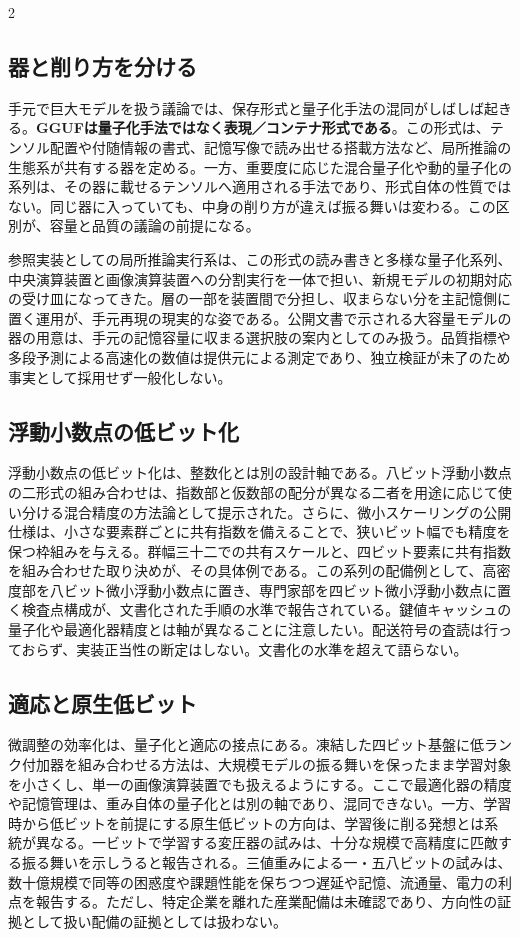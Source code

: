 \documentclass[lualatex,a4paper,10pt]{jlreq}
\begin{document}
\begin{multicols}{2}
\subsection{器と削り方を分ける}
手元で巨大モデルを扱う議論では、保存形式と量子化手法の混同がしばしば起きる。\textbf{GGUFは量子化手法ではなく表現／コンテナ形式である}\autocite{gguf}。この形式は、テンソル配置や付随情報の書式、記憶写像で読み出せる搭載方法など、局所推論の生態系が共有する器を定める。一方、重要度に応じた混合量子化や動的量子化の系列は、その器に載せるテンソルへ適用される手法であり、形式自体の性質ではない。同じ器に入っていても、中身の削り方が違えば振る舞いは変わる。この区別が、容量と品質の議論の前提になる。

参照実装としての局所推論実行系は、この形式の読み書きと多様な量子化系列、中央演算装置と画像演算装置への分割実行を一体で担い、新規モデルの初期対応の受け皿になってきた\autocite{llamacpp}。層の一部を装置間で分担し、収まらない分を主記憶側に置く運用が、手元再現の現実的な姿である。公開文書で示される大容量モデルの器の用意は、手元の記憶容量に収まる選択肢の案内としてのみ扱う\autocite{unslothglm}。品質指標や多段予測による高速化の数値は提供元による測定であり、独立検証が未了のため事実として採用せず一般化しない。

\subsection{浮動小数点の低ビット化}
浮動小数点の低ビット化は、整数化とは別の設計軸である。八ビット浮動小数点の二形式の組み合わせは、指数部と仮数部の配分が異なる二者を用途に応じて使い分ける混合精度の方法論として提示された\autocite{fp8formats}。さらに、微小スケーリングの公開仕様は、小さな要素群ごとに共有指数を備えることで、狭いビット幅でも精度を保つ枠組みを与える\autocite{mxspec}。群幅三十二での共有スケールと、四ビット要素に共有指数を組み合わせた取り決めが、その具体例である。この系列の配備例として、高密度部を八ビット微小浮動小数点に置き、専門家部を四ビット微小浮動小数点に置く検査点構成が、文書化された手順の水準で報告されている\autocite{mxfp4}。鍵値キャッシュの量子化や最適化器精度とは軸が異なることに注意したい。配送符号の査読は行っておらず、実装正当性の断定はしない。文書化の水準を超えて語らない。

\subsection{適応と原生低ビット}
微調整の効率化は、量子化と適応の接点にある。凍結した四ビット基盤に低ランク付加器を組み合わせる方法は、大規模モデルの振る舞いを保ったまま学習対象を小さくし、単一の画像演算装置でも扱えるようにする\autocite{qlora}。ここで最適化器の精度や記憶管理は、重み自体の量子化とは別の軸であり、混同できない。一方、学習時から低ビットを前提にする原生低ビットの方向は、学習後に削る発想とは系統が異なる。一ビットで学習する変圧器の試みは、十分な規模で高精度に匹敵する振る舞いを示しうると報告される\autocite{bitnet}。三値重みによる一・五八ビットの試みは、数十億規模で同等の困惑度や課題性能を保ちつつ遅延や記憶、流通量、電力の利点を報告する\autocite{bitnet158}。ただし、特定企業を離れた産業配備は未確認であり、方向性の証拠として扱い配備の証拠としては扱わない。


\end{multicols}
\end{document}

